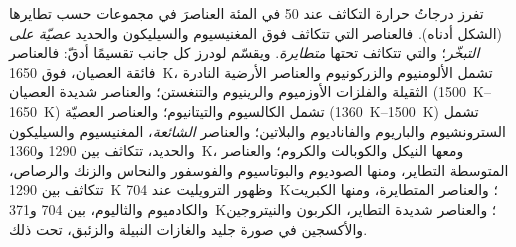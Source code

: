 تفرز درجاتُ حرارة التكاثف عند 50 في المئة العناصرَ في مجموعات حسب
تطايرها (الشكل أدناه). فالعناصر التي تتكاثف فوق المغنيسيوم والسيليكون
والحديد \emph{عصيّة على التبخّر}؛ والتي تتكاثف تحتها \emph{متطايرة}.
ويقسّم لودرز كل جانب تقسيمًا أدقّ: فالعناصر فائقة العصيان، فوق
\qty{1650}{K}، تشمل الألومنيوم والزركونيوم والعناصر الأرضية النادرة الثقيلة
والفلزات الأوزميوم والرينيوم والتنغستن؛ والعناصر شديدة العصيان
(\qtyrange{1500}{1650}{K}) تشمل الكالسيوم والتيتانيوم؛ والعناصر العصيّة
(\qtyrange{1360}{1500}{K}) تشمل السترونشيوم والباريوم والفاناديوم والبلاتين؛
والعناصر
\emph{الشائعة}، المغنيسيوم والسيليكون والحديد، تتكاثف بين \num{1290}
و\qty{1360}{K}، ومعها النيكل والكوبالت والكروم؛ والعناصر المتوسطة
التطاير، ومنها الصوديوم والبوتاسيوم والفوسفور والنحاس والزنك
والرصاص، تتكاثف بين \qty{1290}{K} وظهور الترويليت عند
\qty{704}{K}؛ والعناصر المتطايرة، ومنها الكبريت والكادميوم والثاليوم،
بين \num{704} و\qty{371}{K}؛ والعناصر شديدة التطاير، الكربون
والنيتروجين والأكسجين في صورة جليد والغازات النبيلة والزئبق، تحت ذلك.

